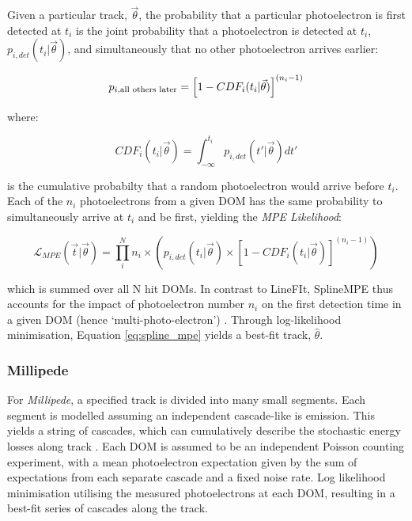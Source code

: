 Given a particular track, $\vec{\theta}$, the probability that a particular photoelectron is first detected at $t_{i}$ is the joint probability that a photoelectron is detected at $t_{i}$,  $p_{i, det}(t_{i} | \vec{\theta})$, and simultaneously that no other photoelectron arrives earlier:

\begin{equation}
	p_{i, \textup{all others later}} = \left[ 1 - CDF_{i}(t_{i} | \vec{\theta}) \right]^{(n_{i} - 1)}
\end{equation}

where:

\begin{equation}
	CDF_{i}(t_{i} | \vec{\theta}) = \int_{-\infty}^{t_{i}} p_{i, det} (t'| \vec{\theta}) dt'
\end{equation}

is the cumulative probabilty that a random photoelectron would arrive before $t_{i}$. Each of the $n_{i}$ photoelectrons from a given DOM has the same probability to simultaneously arrive at $t_{i}$ and be first, yielding the \emph{MPE Likelihood}:

\begin{equation}
	\mathcal{L}_{MPE}(\vec{t}|\vec{\theta}) = \prod_{i}^{N} n_{i} \times \left( p_{i, det}(t_{i} | \vec{\theta})  \times \left[ 1 - CDF_{i}(t_{i} | \vec{\theta}) \right]^{(n_{i} - 1)} \right)
	\label{eq:spline_mpe}
\end{equation}

which is summed over all N hit DOMs. In contrast to LineFIt, SplineMPE thus accounts for the impact of photoelectron number $n_{i}$ on the first detection time in a given DOM (hence `multi-photo-electron') . Through log-likelihood minimisation, Equation \ref{eq:spline_mpe} yields a best-fit track, $\hat{\theta}$.

\subsubsection{Millipede}
For \emph{Millipede}, a specified track is divided into many small segments. Each segment is modelled assuming an independent cascade-like is emission. This yields a string of cascades, which can cumulatively describe the stochastic energy losses along track \cite{ic_energy_reco_14}. Each DOM is assumed to be an independent Poisson counting experiment, with a mean photoelectron expectation given by the sum of expectations from each separate cascade and a fixed noise rate. Log likelihood minimisation utilising the measured photoelectrons at each DOM, resulting in a best-fit series of cascades along the track.

